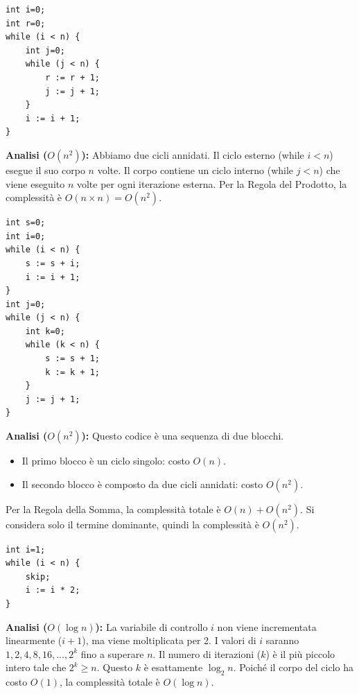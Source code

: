 \begin{example}
\begin{lstlisting}[language={}, basicstyle=\ttfamily\bfseries, backgroundcolor=\color{codegray}, frame=tb, numbers=none, breaklines=true, tabsize=2]
int i=0;
int r=0;
while (i < n) {
    int j=0;
    while (j < n) {
        r := r + 1;
        j := j + 1;
    }
    i := i + 1;
}
\end{lstlisting}
\textbf{Analisi ($O(n^2)$):} Abbiamo due cicli annidati. Il ciclo esterno (while $i<n$) esegue il suo corpo $n$ volte. Il corpo contiene un ciclo interno (while $j<n$) che viene eseguito $n$ volte per ogni iterazione esterna. Per la Regola del Prodotto, la complessità è $O(n \times n) = O(n^2)$.
\end{example}

\begin{example}
\begin{lstlisting}[language={}, basicstyle=\ttfamily\bfseries, backgroundcolor=\color{codegray}, frame=tb, numbers=none, breaklines=true, tabsize=2]
int s=0;
int i=0;
while (i < n) {
    s := s + i;
    i := i + 1;
}
int j=0;
while (j < n) {
    int k=0;
    while (k < n) {
        s := s + 1;
        k := k + 1;
    }
    j := j + 1;
}
\end{lstlisting}
\textbf{Analisi ($O(n^2)$):} Questo codice è una sequenza di due blocchi.
\begin{itemize}
    \item Il primo blocco è un ciclo singolo: costo $O(n)$.
    \item Il secondo blocco è composto da due cicli annidati: costo $O(n^2)$.
\end{itemize}
Per la Regola della Somma, la complessità totale è $O(n) + O(n^2)$. Si considera solo il termine dominante, quindi la complessità è $O(n^2)$.
\end{example}

\begin{example}
\begin{lstlisting}[language={}, basicstyle=\ttfamily\bfseries, backgroundcolor=\color{codegray}, frame=tb, numbers=none, breaklines=true, tabsize=2]
int i=1;
while (i < n) {
    skip;
    i := i * 2;
}
\end{lstlisting}
\textbf{Analisi ($O(\log n)$):} La variabile di controllo $i$ non viene incrementata linearmente ($i+1$), ma viene moltiplicata per 2. I valori di $i$ saranno $1, 2, 4, 8, 16, ..., 2^k$ fino a superare $n$. Il numero di iterazioni ($k$) è il più piccolo intero tale che $2^k \ge n$. Questo $k$ è esattamente $\log_2 n$. Poiché il corpo del ciclo ha costo $O(1)$, la complessità totale è $O(\log n)$.
\end{example}

